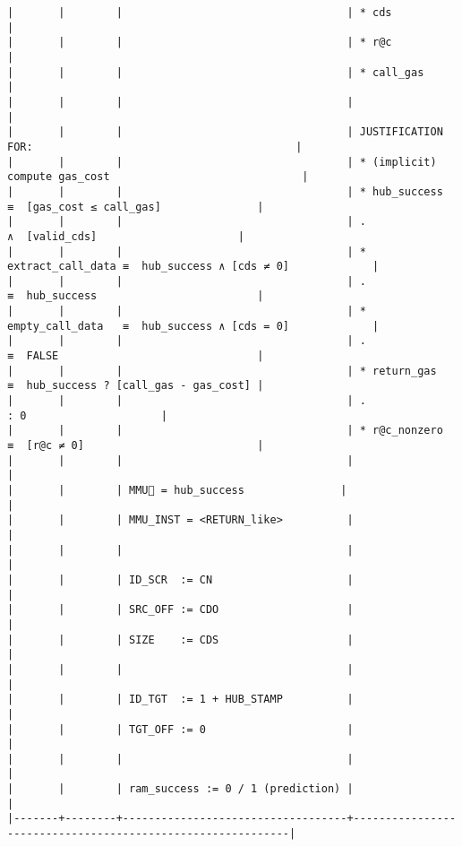 \documentclass[varwidth=\maxdimen,margin=0.5cm,multi={verbatim}]{standalone}
\begin{document}
\begin{verbatim}
|       |        |                                   | * cds                                                      |
|       |        |                                   | * r@c                                                      |
|       |        |                                   | * call_gas                                                 |
|       |        |                                   |                                                            |
|       |        |                                   | JUSTIFICATION FOR:                                         |
|       |        |                                   | * (implicit) compute gas_cost                              |
|       |        |                                   | * hub_success       ≡  [gas_cost ≤ call_gas]               |
|       |        |                                   | .                      ∧  [valid_cds]                      |
|       |        |                                   | * extract_call_data ≡  hub_success ∧ [cds ≠ 0]             |
|       |        |                                   | .                   ≡  hub_success                         |
|       |        |                                   | * empty_call_data   ≡  hub_success ∧ [cds = 0]             |
|       |        |                                   | .                   ≡  FALSE                               |
|       |        |                                   | * return_gas        ≡  hub_success ? [call_gas - gas_cost] |
|       |        |                                   | .                                  : 0                     |
|       |        |                                   | * r@c_nonzero       ≡  [r@c ≠ 0]                           |
|       |        |                                   |                                                            |
|       |        | MMU🚩 = hub_success               |                                                            |
|       |        | MMU_INST = <RETURN_like>          |                                                            |
|       |        |                                   |                                                            |
|       |        | ID_SCR  := CN                     |                                                            |
|       |        | SRC_OFF := CDO                    |                                                            |
|       |        | SIZE    := CDS                    |                                                            |
|       |        |                                   |                                                            |
|       |        | ID_TGT  := 1 + HUB_STAMP          |                                                            |
|       |        | TGT_OFF := 0                      |                                                            |
|       |        |                                   |                                                            |
|       |        | ram_success := 0 / 1 (prediction) |                                                            |
|-------+--------+-----------------------------------+------------------------------------------------------------|



\end{verbatim}
\end{document}
